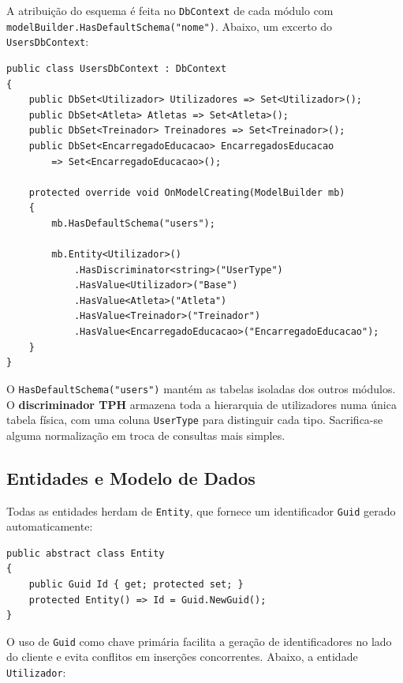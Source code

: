 A atribuição do esquema é feita no \texttt{DbContext} de cada módulo com \texttt{modelBuilder.HasDefaultSchema("nome")}. Abaixo, um excerto do \texttt{UsersDbContext}:

\begin{lstlisting}[language={[Sharp]C},basicstyle=\ttfamily\small,breaklines=true,frame=single,caption={Excerto do \texttt{UsersDbContext} com configuração de esquema e herança TPH.},label={lst:usersdbcontext}]
public class UsersDbContext : DbContext
{
    public DbSet<Utilizador> Utilizadores => Set<Utilizador>();
    public DbSet<Atleta> Atletas => Set<Atleta>();
    public DbSet<Treinador> Treinadores => Set<Treinador>();
    public DbSet<EncarregadoEducacao> EncarregadosEducacao
        => Set<EncarregadoEducacao>();

    protected override void OnModelCreating(ModelBuilder mb)
    {
        mb.HasDefaultSchema("users");

        mb.Entity<Utilizador>()
            .HasDiscriminator<string>("UserType")
            .HasValue<Utilizador>("Base")
            .HasValue<Atleta>("Atleta")
            .HasValue<Treinador>("Treinador")
            .HasValue<EncarregadoEducacao>("EncarregadoEducacao");
    }
}
\end{lstlisting}

O \texttt{HasDefaultSchema("users")} mantém as tabelas isoladas dos outros módulos. O \textbf{discriminador TPH} armazena toda a hierarquia de utilizadores numa única tabela física, com uma coluna \texttt{UserType} para distinguir cada tipo. Sacrifica-se alguma normalização em troca de consultas mais simples.

\subsection{Entidades e Modelo de Dados}

Todas as entidades herdam de \texttt{Entity}, que fornece um identificador \texttt{Guid} gerado automaticamente:

\begin{lstlisting}[language={[Sharp]C},basicstyle=\ttfamily\small,breaklines=true,frame=single,caption={Classe base \texttt{Entity} partilhada por todas as entidades do sistema.},label={lst:entity-base}]
public abstract class Entity
{
    public Guid Id { get; protected set; }
    protected Entity() => Id = Guid.NewGuid();
}
\end{lstlisting}

O uso de \texttt{Guid} como chave primária facilita a geração de identificadores no lado do cliente e evita conflitos em inserções concorrentes. Abaixo, a entidade \texttt{Utilizador}:

